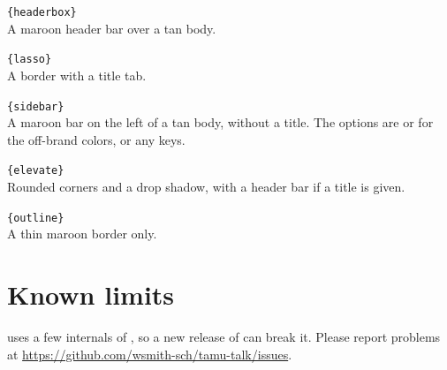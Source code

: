 \documentclass{l3doc}
\begin{document}
\begin{documentation}
\texttt{\{headerbox\}}\\
A maroon header bar over a tan body.

\texttt{\{lasso\}}\\
A border with a title tab.

\texttt{\{sidebar\}}\\
A maroon bar on the left of a tan body,
without a title. The options are  or  for the
off-brand colors, or any  keys.

\texttt{\{elevate\}}\\
Rounded corners and a drop shadow, with a
header bar if a title is given.

\texttt{\{outline\}}\\
A thin maroon border only.

\section{Known limits}

 uses a few internals of ,
so a new release of  can break it. Please report problems at
\url{https://github.com/wsmith-sch/tamu-talk/issues}.

\end{documentation}
\end{document}
